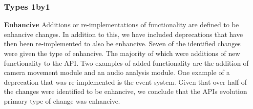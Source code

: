 \documentclass{sig-alternate}
\begin{document}




\subsubsection{Types 1by1}

\smallskip \noindent
\textbf{Enhancive  }
Additions or re-implementations of functionality are defined to be enhancive changes. In addition to this, we have included deprecations that have then been re-implemented to also be enhancive.
Seven of the identified changes were given the type of enhancive. The majority of which were additions of new functionality to the API. Two examples of added functionality are the addition of camera movement module and an audio analysis module. One example of a deprecation that was re-implemented is the event system.
Given that over half of the changes were identified to be enhancive, we conclude that the APIs evolution primary type of change was enhancive. 
\end{document}
